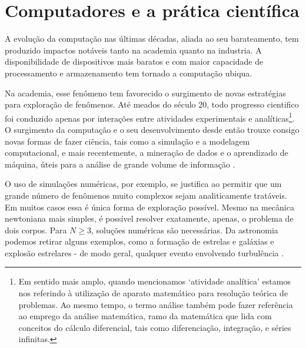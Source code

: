 \chapter{Computadores e a prática científica}\label{computadores-e-ciencia}




A evolução da computação nas últimas décadas, aliada ao seu barateamento, tem produzido impactos notáveis tanto na academia quanto na industria. A disponibilidade de dispositivos mais baratos e com maior capacidade de processamento e armazenamento tem tornado a computação ubiqua. 


Na academia, esse fenômeno tem favorecido o surgimento de novas estratégias para exploração de fenômenos. Até meados do século 20, todo progresso cientifico foi conduzido apenas por interações entre atividades experimentais e analíticas\footnote{
Em sentido mais amplo, quando mencionamos `atividade analítica' estamos nos referindo à utilização de aparato matemático para resolução teórica de problemas. Ao mesmo tempo, o termo análise também pode fazer referência ao emprego da análise matemática, ramo da matemática que lida com conceitos do cálculo diferencial, tais como diferenciação, integração, e séries infinitas.}. O surgimento da computação e o seu desenvolvimento desde então trouxe consigo novas formas de fazer ciência, tais como a simulação e a modelagem computacional, e mais recentemente, a mineração de dados e o aprendizado de máquina, úteis para a análise de grande volume de informação \cite{Djorgovski2005, wing2006}. %


O uso de simulações numéricas, por exemplo, se justifica ao permitir que um grande número de fenômenos muito complexos sejam analiticamente tratáveis. Em muitos casos essa é única forma de exploração possível. Mesmo na mecânica newtoniana mais simples, é possível resolver  exatamente, apenas, o problema de dois corpos. Para $N\geq3$, soluções numéricas são necessárias. Da astronomia podemos retirar alguns exemplos, como a formação de estrelas e galáxias e explosão estrelares - de modo geral, qualquer evento envolvendo turbulência  \cite[]{Djorgovski2005}. %

